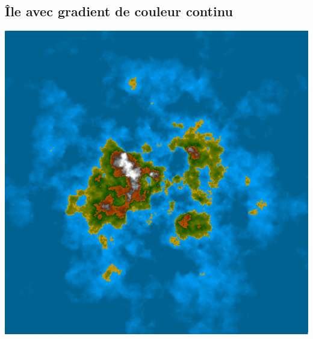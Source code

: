 \documentclass[a4paper, 10pt]{article}
\begin{document}
\begin{center}
\section*{Île avec gradient de couleur continu} 
\includegraphics[scale=0.45]{Triangulation.PNG}
\end{center} 
\end{document}
